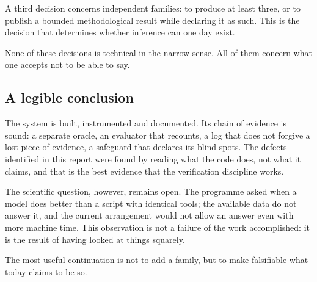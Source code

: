 A third decision concerns independent families: to produce at least three, or to publish a bounded methodological result while declaring it as such. This is the decision that determines whether inference can one day exist.

None of these decisions is technical in the narrow sense. All of them concern what one accepts not to be able to say.

\subsection{A legible conclusion}

The system is built, instrumented and documented. Its chain of evidence is sound: a separate oracle, an evaluator that recounts, a log that does not forgive a lost piece of evidence, a safeguard that declares its blind spots. The defects identified in this report were found by reading what the code does, not what it claims, and that is the best evidence that the verification discipline works.

The scientific question, however, remains open. The programme asked when a model does better than a script with identical tools; the available data do not answer it, and the current arrangement would not allow an answer even with more machine time. This observation is not a failure of the work accomplished: it is the result of having looked at things squarely.

The most useful continuation is not to add a family, but to make falsifiable what today claims to be so.
